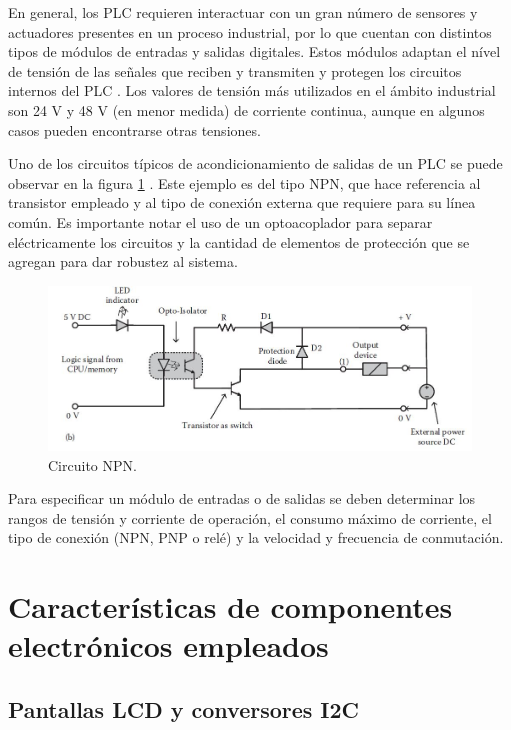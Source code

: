 En general, los PLC requieren interactuar con un gran número de sensores y actuadores presentes en un proceso industrial, por lo que cuentan con distintos tipos de módulos de entradas y salidas digitales. Estos módulos adaptan el nível de tensión de las señales que reciben y transmiten y protegen los circuitos internos del PLC \citep{Introduction_Industrial_Automation}. Los valores de tensión más utilizados en el ámbito industrial son 24 V y 48 V (en menor medida) de corriente continua, aunque en algunos casos pueden encontrarse otras tensiones.

Uno de los circuitos típicos de acondicionamiento de salidas de un PLC se puede observar en la figura \ref{fig:Circuito_NPN}  \citep{Introduction_Industrial_Automation}. Este ejemplo es del tipo NPN, que hace referencia al transistor empleado y al tipo de conexión externa que requiere para su línea común. Es importante notar el uso de un optoacoplador para separar eléctricamente los circuitos y la cantidad de elementos de protección que se agregan para dar robustez al sistema.

\begin{figure}[htbp]
	\centering
	\includegraphics[scale=.5]{./Figures/Circuito_NPN.JPG}
	\caption{Circuito NPN.}
	\label{fig:Circuito_NPN}
\end{figure}

Para especificar un módulo de entradas o de salidas se deben determinar los rangos de tensión y corriente de operación, el consumo máximo de corriente, el tipo de conexión (NPN, PNP o relé) y la velocidad y frecuencia de conmutación.

\section{Características de componentes electrónicos empleados}

\subsection{Pantallas LCD y conversores I2C}
\label{seccion_display_led}

